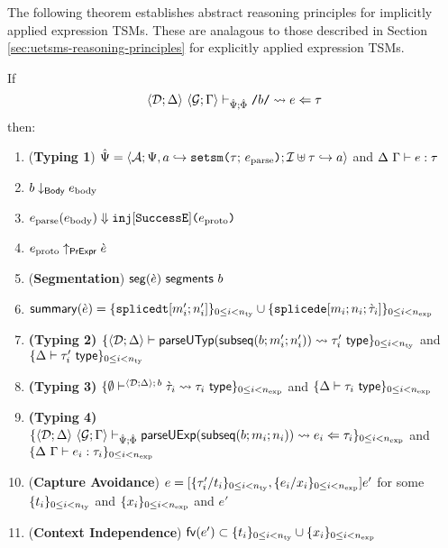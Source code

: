 The following theorem establishes abstract reasoning principles for implicitly applied expression TSMs. These are analagous to those described in Section \ref{sec:uetsms-reasoning-principles} for explicitly applied expression TSMs.
\begingroup
\def\thetheorem{\ref{thm:tsc-B}}
\begin{theorem}
If \[\langle \mathcal{D}; \Delta \rangle~\langle \mathcal{G}; \Gamma \rangle \vdash_{\hat{\Psi}; \hat\Phi} {\texttt{/}b\texttt{/}} \leadsto e \Leftarrow \tau\] then:
\begin{enumerate}
\item (\textbf{Typing 1}) $\hat{\Psi} = \langle \mathcal{A}; \Psi, a \hookrightarrow \texttt{setsm}\texttt{(}\tau;\,e_\text{parse}\texttt{)}; \mathcal{I} \uplus \tau \hookrightarrow a \rangle$ and $\Delta~\Gamma \vdash e : \tau$
\item $b \downarrow_\mathsf{Body} e_\text{body}$
\item $e_\text{parse}(e_\text{body}) \Downarrow \texttt{inj}[\mathtt{SuccessE}]\texttt{(}e_\text{proto}\texttt{)}$
\item $e_\text{proto} \uparrow_\mathsf{PrExpr} \grave{e}$
\item (\textbf{Segmentation}) $\mathsf{seg}(\grave{e})~\mathsf{segments}~b$
\item $\mathsf{summary}(\grave{e}) = \{\texttt{splicedt}[m'_i; n'_i]\}_{0 \leq i < n_\text{ty}} \cup \{\texttt{splicede}[m_i; n_i; \grave{\tau}_i]\}_{0 \leq i < n_\text{exp}}$
\item \textbf{(Typing 2)} $\{
      \langle \mathcal{D}; \Delta \rangle \vdash 
        \mathsf{parseUTyp}(\mathsf{subseq}(b; m'_i; n'_i))
       \leadsto \tau'_i~\mathsf{type}
    \}_{0 \leq i < n_\text{ty}}$ and $\{\Delta \vdash \tau'_i~\mathsf{type}\}_{0 \leq i < n_\text{ty}}$
\item \textbf{(Typing 3)} $\{
  \emptyset\vdash^{
    \langle \mathcal{D}; \Delta \rangle
      ;\,b
  } 
    \grave{\tau}_i
   \leadsto \tau_i~\mathsf{type}
\}_{0 \leq i < n_\text{exp}}$ and $\{\Delta \vdash \tau_i~\mathsf{type}\}_{0 \leq i < n_\text{exp}}$
\item \textbf{(Typing 4)} $\{
  \langle \mathcal{D}; \Delta \rangle~\langle \mathcal{G}; \Gamma \rangle \vdash_{\hat{\Psi}; \hat\Phi} \mathsf{parseUExp}(\mathsf{subseq}(b; m_i; n_i)) \leadsto e_i \Leftarrow \tau_i
\}_{0 \leq i < n_\text{exp}}$ and $\{\Delta~\Gamma \vdash e_i : \tau_i\}_{0 \leq i < n_\text{exp}}$
\item (\textbf{Capture Avoidance}) $e = [\{\tau'_i/t_i\}_{0 \leq i < n_\text{ty}}, \{e_i/x_i\}_{0 \leq i < n_\text{exp}}]e'$ for some $\{t_i\}_{0 \leq i < n_\text{ty}}$ and $\{x_i\}_{0 \leq i < n_\text{exp}}$ and $e'$
\item (\textbf{Context Independence}) $\mathsf{fv}(e') \subset \{t_i\}_{0 \leq i < n_\text{ty}} \cup \{x_i\}_{0 \leq i < n_\text{exp}}$
\end{enumerate}
\end{theorem}
\endgroup

